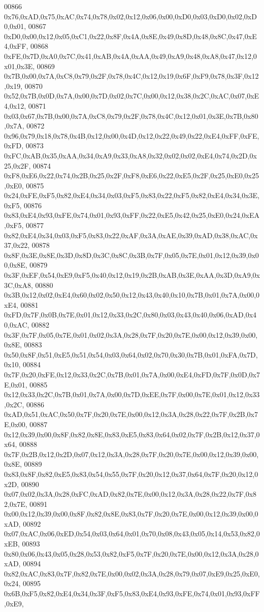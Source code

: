 \begin{DoxyCode}
00866 0x76,0xAD,0x75,0xAC,0x74,0x78,0x02,0x12,0x06,0x00,0xD0,0x03,0xD0,0x02,0xD0,0x01,
00867 0xD0,0x00,0x12,0x05,0xC1,0x22,0x8F,0x4A,0x8E,0x49,0x8D,0x48,0x8C,0x47,0xE4,0xFF,
00868 0xFE,0x7D,0xA0,0x7C,0x41,0xAB,0x4A,0xAA,0x49,0xA9,0x48,0xA8,0x47,0x12,0x01,0x3E,
00869 0x7B,0x00,0x7A,0xC8,0x79,0x2F,0x78,0x4C,0x12,0x19,0x6F,0xF9,0x78,0x3F,0x12,0x19,
00870 0x52,0x7B,0x0D,0x7A,0x00,0x7D,0x02,0x7C,0x00,0x12,0x38,0x2C,0xAC,0x07,0xE4,0x12,
00871 0x03,0x67,0x7B,0x00,0x7A,0xC8,0x79,0x2F,0x78,0x4C,0x12,0x01,0x3E,0x7B,0x80,0x7A,
00872 0x96,0x79,0x18,0x78,0x4B,0x12,0x00,0x4D,0x12,0x22,0x49,0x22,0xE4,0xFF,0xFE,0xFD,
00873 0xFC,0xAB,0x35,0xAA,0x34,0xA9,0x33,0xA8,0x32,0x02,0x02,0xE4,0x74,0x2D,0x25,0x2F,
00874 0xF8,0xE6,0x22,0x74,0x2B,0x25,0x2F,0xF8,0xE6,0x22,0xE5,0x2F,0x25,0xE0,0x25,0xE0,
00875 0x24,0xFE,0xF5,0x82,0xE4,0x34,0x03,0xF5,0x83,0x22,0xF5,0x82,0xE4,0x34,0x3E,0xF5,
00876 0x83,0xE4,0x93,0xFE,0x74,0x01,0x93,0xFF,0x22,0xE5,0x42,0x25,0xE0,0x24,0xEA,0xF5,
00877 0x82,0xE4,0x34,0x03,0xF5,0x83,0x22,0xAF,0x3A,0xAE,0x39,0xAD,0x38,0xAC,0x37,0x22,
00878 0x8F,0x3E,0x8E,0x3D,0x8D,0x3C,0x8C,0x3B,0x7F,0x05,0x7E,0x01,0x12,0x39,0x00,0x8E,
00879 0x3F,0xEF,0x54,0xE9,0xF5,0x40,0x12,0x19,0x2B,0xAB,0x3E,0xAA,0x3D,0xA9,0x3C,0xA8,
00880 0x3B,0x12,0x02,0xE4,0x60,0x02,0x50,0x12,0x43,0x40,0x10,0x7B,0x01,0x7A,0x00,0xE4,
00881 0xFD,0x7F,0x0B,0x7E,0x01,0x12,0x33,0x2C,0x80,0x03,0x43,0x40,0x06,0xAD,0x40,0xAC,
00882 0x3F,0x7F,0x05,0x7E,0x01,0x02,0x3A,0x28,0x7F,0x20,0x7E,0x00,0x12,0x39,0x00,0x8E,
00883 0x50,0x8F,0x51,0xE5,0x51,0x54,0x03,0x64,0x02,0x70,0x30,0x7B,0x01,0xFA,0x7D,0x10,
00884 0x7F,0x20,0xFE,0x12,0x33,0x2C,0x7B,0x01,0x7A,0x00,0xE4,0xFD,0x7F,0x0D,0x7E,0x01,
00885 0x12,0x33,0x2C,0x7B,0x01,0x7A,0x00,0x7D,0xEE,0x7F,0x00,0x7E,0x01,0x12,0x33,0x2C,
00886 0xAD,0x51,0xAC,0x50,0x7F,0x20,0x7E,0x00,0x12,0x3A,0x28,0x22,0x7F,0x2B,0x7E,0x00,
00887 0x12,0x39,0x00,0x8F,0x82,0x8E,0x83,0xE5,0x83,0x64,0x02,0x7F,0x2B,0x12,0x37,0x64,
00888 0x7F,0x2B,0x12,0x2D,0x07,0x12,0x3A,0x28,0x7F,0x20,0x7E,0x00,0x12,0x39,0x00,0x8E,
00889 0x83,0x8F,0x82,0xE5,0x83,0x54,0x55,0x7F,0x20,0x12,0x37,0x64,0x7F,0x20,0x12,0x2D,
00890 0x07,0x02,0x3A,0x28,0xFC,0xAD,0x82,0x7E,0x00,0x12,0x3A,0x28,0x22,0x7F,0x82,0x7E,
00891 0x00,0x12,0x39,0x00,0x8F,0x82,0x8E,0x83,0x7F,0x20,0x7E,0x00,0x12,0x39,0x00,0xAD,
00892 0x07,0xAC,0x06,0xED,0x54,0x03,0x64,0x01,0x70,0x08,0x43,0x05,0x14,0x53,0x82,0xEB,
00893 0x80,0x06,0x43,0x05,0x28,0x53,0x82,0xF5,0x7F,0x20,0x7E,0x00,0x12,0x3A,0x28,0xAD,
00894 0x82,0xAC,0x83,0x7F,0x82,0x7E,0x00,0x02,0x3A,0x28,0x79,0x07,0xE9,0x25,0xE0,0x24,
00895 0x6B,0xF5,0x82,0xE4,0x34,0x3F,0xF5,0x83,0xE4,0x93,0xFE,0x74,0x01,0x93,0xFF,0xE9,

\end{DoxyCode}
